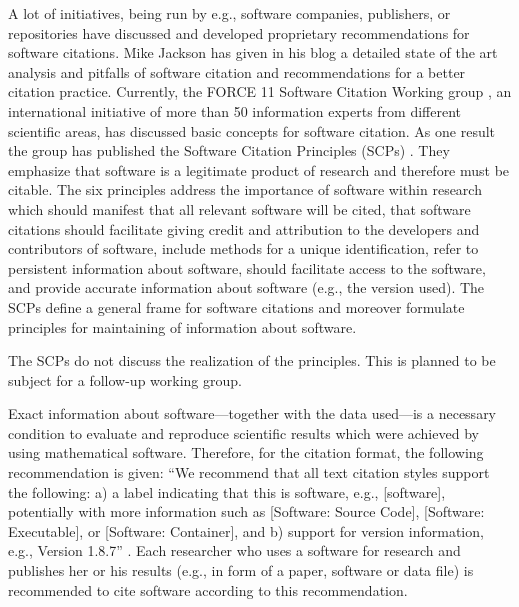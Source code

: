 \documentclass[a4paper,11pt]{article}
\begin{document}
\begin{multicols}{2}
A lot of initiatives, being run by e.g., software companies, publishers, or repositories have discussed and developed proprietary recommendations for software citations. Mike Jackson  has given in his blog \cite{Jackson} a detailed state of the art analysis and pitfalls of software citation and recommendations for a better citation practice. Currently, the FORCE 11 Software Citation Working group \cite{SoftwareCitationWG}, an international initiative of more than 50 information experts from different scientific areas, has discussed basic concepts for software citation. As one result the group has published the Software Citation Principles (SCPs) \cite{SoftwareCitationPrinciples}. They emphasize that software is a legitimate product of research and therefore must be citable.  The six principles address the importance of software within research which should manifest  that all relevant software will be cited, that software citations should facilitate giving credit and attribution to the developers and contributors of software, include methods for a  unique identification, refer to persistent information about software, should facilitate access to the software, and provide accurate information about software (e.g., the version used). The SCPs define a general frame for software citations and moreover formulate principles for  maintaining of information about software.

The SCPs do not discuss the realization of the principles.  This is planned to be subject for a follow-up working group.\par

Exact information about software---together with the data used---is a necessary condition to evaluate and reproduce scientific results which were achieved by using mathematical software. Therefore, for the citation format, the following recommendation is given: ``We recommend that all text citation styles support the following: a) a label indicating that this is software, e.g., [software], potentially with more information such as [Software: Source Code], [Software: Executable], or [Software: Container], and b) support for version information, e.g., Version 1.8.7'' \cite{SoftwareCitationPrinciples}.  Each researcher who uses a software for research and publishes her or his results (e.g., in form of a paper, software or data file) is recommended to cite software according to this recommendation.


\end{multicols}
\end{document}
